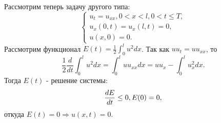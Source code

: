 \documentclass[11pt]{article}
\def\zall{\setcounter{lem}{0}\setcounter{cnsqnc}{0}\setcounter{th}{0}\setcounter{Cmt}{0}\setcounter{equation}{0}}
\newcounter{lem}\setcounter{lem}{0}
\newcounter{th}\setcounter{th}{0}
\newcounter{cnsqnc}\setcounter{cnsqnc}{0}
\newcounter{Cmt}\setcounter{Cmt}{0}
\begin{document}
Рассмотрим теперь задачу другого типа:
\begin{equation}
\begin{cases}
u_t = u_{xx}, 0 < x < l, 0 < t \leq T, \\
u_x(0, t) = u_x(l, t) = 0, \\
u(x, 0) = 0.
\end{cases}
\end{equation}
Рассмотрим функционал $E(t) = \frac12\int_0^lu^2dx$. Так как $uu_t = uu_{xx}$, то
\begin{equation}
\frac12\frac{d}{dt}\int_0^lu^2dx = \int_0^luu_{xx}dx = uu_x - \int_0^lu_x^2dx.
\end{equation}
Тогда $E(t)$ - решение системы:
\begin{equation}
\frac{dE}{dt} \leq 0, \\
E(0) = 0,
\end{equation}
откуда $E(t) = 0 \Rightarrow u(x, t) = 0$.
\zall
\end{document}
